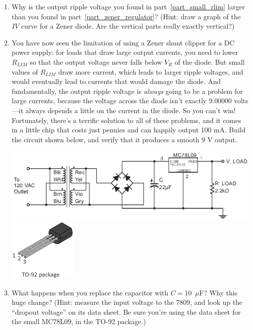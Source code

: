 \begin{enumerate}[wide]
\item Why is the output ripple voltage you found in part~\ref{part_small_rlim} larger than you found in part~\ref{part_zener_regulator}?  (Hint: draw a graph of the $IV$ curve for a Zener diode.  Are the vertical parts really exactly vertical?)

\item You have now seen the limitation of using a Zener shunt clipper for a DC power supply: for loads that draw large output currents, you need to lower $R_{LIM}$ so that the output voltage never falls below $V_R$ of the diode.  But small values of $R_{LIM}$ draw more current, which leads to larger ripple voltages, and would eventually lead to currents that would damage the diode.  And fundamentally, the output ripple voltage is \textit{always} going to be a problem for large currents, because the voltage across the diode isn't exactly 9.00000 volts---it always depends a little on the current in the diode.  So you can't win!  Fortunately, there's a terrific solution to all of these problems, and it comes in a little chip that costs just pennies and can happily output 100 mA.  Build the circuit shown below, and verify that it produces a smooth 9 V output.
\begin{center}
\includegraphics{power_supply/7809_regulator.eps}
\includegraphics[width=1.3in]{appendices/pinouts/TO-92_package_pinout.eps}
\end{center}
 
\item What happens when you replace the capacitor with $C = 10$~$\mu$F?  Why this huge change?  (Hint: measure the input voltage to the 7809, and look up the ``dropout voltage'' on its data sheet.  Be sure you're using the data sheet for the small MC78L09, in the TO-92 package.)


\end{enumerate}
